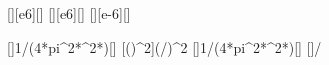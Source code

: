 [\mega\hertz][e6][\hertz]
[\mega\hertz][e6][\hertz]
[\micro\henry][e-6][\henry]

[]{1/(4*pi^2*\faX^2*\LiX)}[\farad]
[\left(\right)^2]{(\faX/\fbX)^2}
[]{1/(4*pi^2*\fbX^2*\LiX)}[\farad]
[]{\faX/\fbX}
